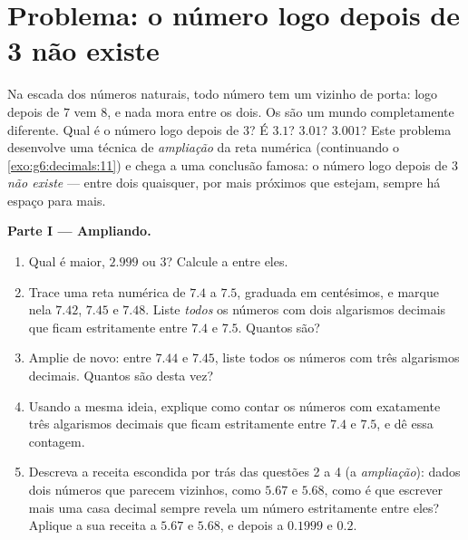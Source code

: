 \section{Problema: o número logo depois de 3 não existe}

\begin{problem}
\label{pb:g6:decimals:1}
Na escada dos números naturais, todo número tem um vizinho de porta:
logo depois de $7$ vem $8$, e nada mora entre os dois. Os  são um mundo completamente diferente. Qual é o número logo
depois de $3$? É $3.1$? $3.01$? $3.001$? Este problema desenvolve uma
técnica de \emph{ampliação} da reta numérica (continuando o
\cref{exo:g6:decimals:11}) e chega a uma conclusão famosa: o número
logo depois de $3$ \emph{não existe} --- entre dois 
quaisquer, por mais próximos que estejam, sempre há espaço para mais.

\medskip
\noindent\textbf{Parte I --- Ampliando.}
\begin{enumerate}
  \item Qual é maior, $2.999$ ou $3$? Calcule a  entre eles.
  \item Trace uma reta numérica de $7.4$ a $7.5$, graduada em
        centésimos, e marque nela $7.42$, $7.45$ e $7.48$. Liste
        \emph{todos} os números com dois algarismos decimais que ficam
        estritamente entre $7.4$ e $7.5$. Quantos são?
  \item Amplie de novo: entre $7.44$ e $7.45$, liste todos os números
        com três algarismos decimais. Quantos são desta vez?
  \item Usando a mesma ideia, explique como contar os números com
        exatamente três algarismos decimais que ficam estritamente
        entre $7.4$ e $7.5$, e dê essa contagem.
  \item Descreva a receita escondida por trás das questões 2 a 4 (a
        \emph{ampliação}): dados dois números que parecem vizinhos,
        como $5.67$ e $5.68$, como é que escrever mais uma casa decimal
        sempre revela um número estritamente entre eles? Aplique a sua
        receita a $5.67$ e $5.68$, e depois a $0.1999$ e $0.2$.
\end{enumerate}


\end{problem}
